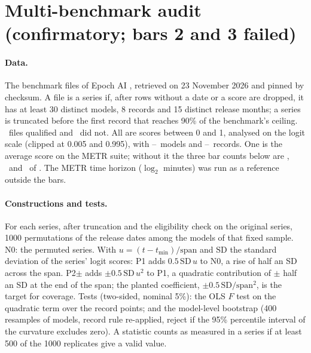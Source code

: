 \documentclass[aps,pre,twocolumn,superscriptaddress,nofootinbib,9pt]{revtex4-2}
\begin{document}
\section{Multi-benchmark audit (confirmatory; bars 2 and 3 failed)}\label{sup:audit}
\paragraph*{Data.} The benchmark files of Epoch AI \cite{epochdata}, retrieved on 23 November 2026 and pinned by checksum. A file is a series if, after rows without a date or a score are dropped, it has at least 30 distinct models, 8 records and 15 distinct release months; a series is truncated before the first record that reaches 90\% of the benchmark's ceiling. \mbN\ files qualified and \mbExcluded\ did not. All are scores between 0 and 1, analysed on the logit scale (clipped at 0.005 and 0.995), with \mbMmin--\mbMmax\ models and \mbRecMin--\mbRecMax\ records. One is the average score on the METR suite; without it the three bar counts below are \mbBarOneNoMetr, \mbBarTwoNoMetr\ and \mbOverNoMetr\ of \mbNNoMetr. The METR time horizon ($\log_2$ minutes) was run as a reference outside the bars.

\paragraph*{Constructions and tests.} For each series, after truncation and the eligibility check on the original series, 1000 permutations of the release dates among the models of that fixed sample. N0: the permuted series. With $u=(t-t_{\min})/\text{span}$ and $\text{SD}$ the standard deviation of the series' logit scores: P1 adds $0.5\,\text{SD}\,u$ to N0, a rise of half an SD across the span. P2$\pm$ adds $\pm0.5\,\text{SD}\,u^2$ to P1, a quadratic contribution of $\pm$ half an SD at the end of the span; the planted coefficient, $\pm0.5\,\text{SD}/\text{span}^2$, is the target for coverage. Tests (two-sided, nominal 5\%): the OLS $F$ test on the quadratic term over the record points; and the model-level bootstrap (400 resamples of models, record rule re-applied, reject if the 95\% percentile interval of the curvature excludes zero). A statistic counts as measured in a series if at least 500 of the 1000 replicates give a valid value.
\end{document}
